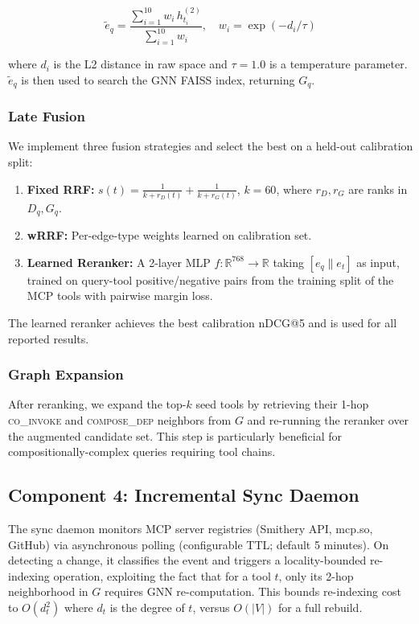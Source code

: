 \documentclass[conference]{IEEEtran}
\begin{document}
\begin{equation}
\tilde{e}_q = \frac{\sum_{i=1}^{10} w_i\, h_{t_i}^{(2)}}
                   {\sum_{i=1}^{10} w_i},
\quad
w_i = \exp(-d_i / \tau)
\label{eq:bridge}
\end{equation}

\noindent where $d_i$ is the L2 distance in raw space and
$\tau = 1.0$ is a temperature parameter.
$\tilde{e}_q$ is then used to search the GNN FAISS index, returning
$G_q$.

\subsubsection{Late Fusion}
We implement three fusion strategies and select the best on a
held-out calibration split:

\begin{enumerate}
    \item \textbf{Fixed RRF:}
    $s(t) = \frac{1}{k + r_D(t)} + \frac{1}{k + r_G(t)}$,
    $k = 60$, where $r_D, r_G$ are ranks in $D_q, G_q$.

    \item \textbf{wRRF:} Per-edge-type weights learned on
    calibration set.

    \item \textbf{Learned Reranker:} A 2-layer MLP
    $f\!: \mathbb{R}^{768} \to \mathbb{R}$ taking
    $[e_q \| e_t]$ as input, trained on query-tool positive/negative pairs from the training split of the MCP tools with pairwise margin loss.
\end{enumerate}

The learned reranker achieves the best calibration nDCG@5 and is used
for all reported results.

\subsubsection{Graph Expansion}
After reranking, we expand the top-$k$ seed tools by retrieving
their 1-hop \textsc{co\_invoke} and \textsc{compose\_dep} neighbors
from $G$ and re-running the reranker over the augmented candidate
set. This step is particularly beneficial for
compositionally-complex queries requiring tool chains.

\subsection{Component 4: Incremental Sync Daemon}

The sync daemon monitors MCP server registries (Smithery API,
mcp.so, GitHub) via asynchronous polling (configurable TTL; default 5
minutes). On detecting a change, it classifies the event and triggers
a locality-bounded re-indexing operation, exploiting the fact that
for a tool $t$, only its 2-hop neighborhood in $G$ requires GNN
re-computation. This bounds re-indexing cost to $O(d_t^2)$ where
$d_t$ is the degree of $t$, versus $O(|V|)$ for a full rebuild.
\end{document}
